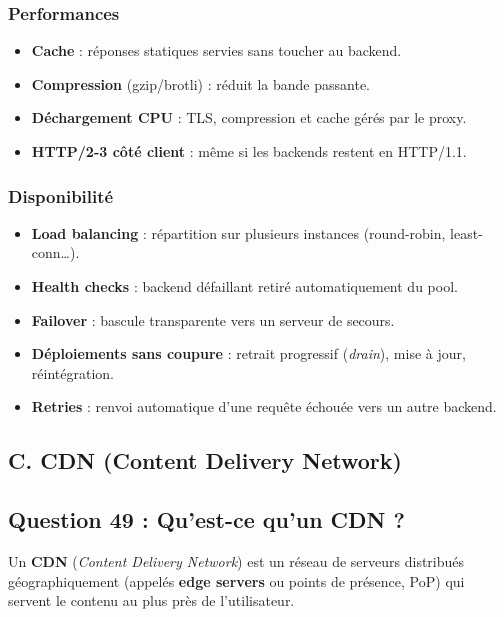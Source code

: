 \documentclass[12pt,a4paper]{article}
\begin{document}
\subsubsection*{Performances}
\begin{itemize}
  \item \textbf{Cache} : r\'eponses statiques servies sans toucher au backend.
  \item \textbf{Compression} (gzip/brotli) : r\'eduit la bande passante.
  \item \textbf{D\'echargement CPU} : TLS, compression et cache g\'er\'es par le proxy.
  \item \textbf{HTTP/2-3 c\^ot\'e client} : m\^eme si les backends restent en HTTP/1.1.
\end{itemize}

\subsubsection*{Disponibilit\'e}
\begin{itemize}
  \item \textbf{Load balancing} : r\'epartition sur plusieurs instances (round-robin, least-conn\ldots).
  \item \textbf{Health checks} : backend d\'efaillant retir\'e automatiquement du pool.
  \item \textbf{Failover} : bascule transparente vers un serveur de secours.
  \item \textbf{D\'eploiements sans coupure} : retrait progressif (\textit{drain}), mise \`a jour, r\'eint\'egration.
  \item \textbf{Retries} : renvoi automatique d'une requ\^ete \'echou\'ee vers un autre backend.
\end{itemize}

\subsection*{C. CDN (Content Delivery Network)}
\subsection*{Question 49 : Qu'est-ce qu'un CDN ?}

Un \textbf{CDN} (\textit{Content Delivery Network}) est un r\'eseau de serveurs distribu\'es g\'eographiquement (appel\'es \textbf{edge servers} ou points de pr\'esence, PoP) qui servent le contenu au plus pr\`es de l'utilisateur.
\end{document}

